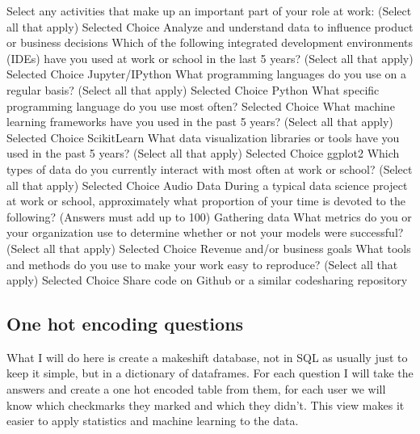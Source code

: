 \documentclass[letterpaper,10pt,english]{jupyterBook}
\begin{document}
\begin{sphinxVerbatim}[commandchars=\\\{\}]
Select any activities that make up an important part of your role at work: (Select all that apply) \PYGZhy{} Selected Choice \PYGZhy{} Analyze and understand data to influence product or business decisions
Which of the following integrated development environments (IDE\PYGZsq{}s) have you used at work or school in the last 5 years? (Select all that apply) \PYGZhy{} Selected Choice \PYGZhy{} Jupyter/IPython
What programming languages do you use on a regular basis? (Select all that apply) \PYGZhy{} Selected Choice \PYGZhy{} Python
What specific programming language do you use most often? \PYGZhy{} Selected Choice
What machine learning frameworks have you used in the past 5 years? (Select all that apply) \PYGZhy{} Selected Choice \PYGZhy{} Scikit\PYGZhy{}Learn
What data visualization libraries or tools have you used in the past 5 years? (Select all that apply) \PYGZhy{} Selected Choice \PYGZhy{} ggplot2
Which types of data do you currently interact with most often at work or school? (Select all that apply) \PYGZhy{} Selected Choice \PYGZhy{} Audio Data
During a typical data science project at work or school, approximately what proportion of your time is devoted to the following? (Answers must add up to 100\PYGZpc{}) \PYGZhy{} Gathering data
What metrics do you or your organization use to determine whether or not your models were successful? (Select all that apply) \PYGZhy{} Selected Choice \PYGZhy{} Revenue and/or business goals
What tools and methods do you use to make your work easy to reproduce? (Select all that apply) \PYGZhy{} Selected Choice \PYGZhy{} Share code on Github or a similar code\PYGZhy{}sharing repository
\end{sphinxVerbatim}


\subsection{One hot encoding questions}
\label{\detokenize{c7_case_studies/UserSurvey:one-hot-encoding-questions}}
\sphinxAtStartPar
What I will do here is create a makeshift database, not in SQL as usually just to keep it simple, but in a dictionary of dataframes. For each question I will take the answers and create a one hot encoded table from them, for each user we will know which checkmarks they marked and which they didn’t. This view makes it easier to apply statistics and machine learning to the data.
\end{document}
